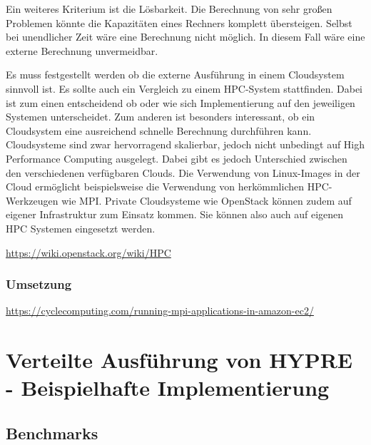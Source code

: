 \documentclass[a4paper,10pt]{article}
\numberwithin{figure}{section}
\numberwithin{table}{section}
\begin{document}
Ein weiteres Kriterium ist die Lösbarkeit.
Die Berechnung von sehr großen Problemen könnte die Kapazitäten eines Rechners komplett übersteigen.
Selbst bei unendlicher Zeit wäre eine Berechnung nicht möglich.
In diesem Fall wäre eine externe Berechnung unvermeidbar.

Es muss festgestellt werden ob die externe Ausführung in einem Cloudsystem sinnvoll ist.
Es sollte auch ein Vergleich zu einem HPC-System stattfinden.
Dabei ist zum einen entscheidend ob oder wie sich Implementierung auf den jeweiligen Systemen unterscheidet.
Zum anderen ist besonders interessant, ob ein Cloudsystem eine ausreichend schnelle Berechnung durchführen kann.
Cloudsysteme sind zwar hervorragend skalierbar, jedoch nicht unbedingt auf High Performance Computing ausgelegt.
Dabei gibt es jedoch Unterschied zwischen den verschiedenen verfügbaren Clouds.
Die Verwendung von Linux-Images in der Cloud ermöglicht beispielsweise die Verwendung von herkömmlichen HPC-Werkzeugen wie MPI.
Private Cloudsysteme wie OpenStack können zudem auf eigener Infrastruktur zum Einsatz kommen.
Sie können also auch auf eigenen HPC Systemen eingesetzt werden.

\url{https://wiki.openstack.org/wiki/HPC}

\subsubsection{Umsetzung}

\url{https://cyclecomputing.com/running-mpi-applications-in-amazon-ec2/}

\newpage











\section{Verteilte Ausführung von HYPRE - Beispielhafte Implementierung}




\subsection{Benchmarks}

\end{document}
